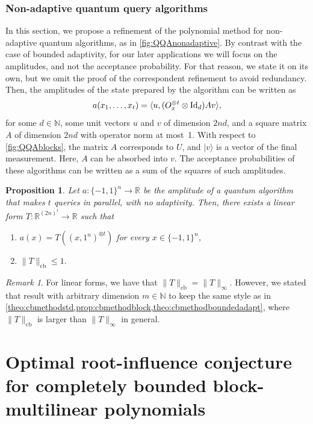 \documentclass[11pt]{article}
\DeclareMathOperator{\cb}{cb}
\newcommand{\norm}[1]{\|#1\|}
\newcommand{\R}{\mathbb{R}} %
\newcommand{\N}{\mathbb{N}} %
\newcommand{\1}{\mathbf{1}}
\newcommand{\Id}{\ensuremath{\mathop{\rm Id}\nolimits}}
\newcommand{\ket}[1]{|#1\rangle}
\theoremstyle{plain}
\newtheorem{proposition}[theorem]{Proposition}
\theoremstyle{definition}
\theoremstyle{remark}
\newtheorem{remark}[theorem]{Remark}
\begin{document}
\subsubsection{Non-adaptive quantum query algorithms} In this section, we propose a refinement of the polynomial method for non-adaptive quantum algorithms, as in \cref{fig:QQAnonadaptive}. By contrast with the case of bounded adaptivity, for our later applications we will focus on the amplitudes, and not the acceptance probability. For that reason, we state it on its own, but we omit the proof of the correspondent refinement to avoid redundancy. 
Then, the amplitudes of the state prepared by the algorithm can be written as
\begin{equation}
    a(x_1,\dots,x_t)=\langle u,(O_{x}^{\otimes t}\otimes \Id_d)Av\rangle,
\end{equation} 
for some $d\in\mathbb N$, some unit vectors $u$ and $v$ of dimension $2nd$, and a square matrix $A$ of dimension $2nd$ with operator norm at most~1. With respect to \cref{fig:QQAblocks}, the matrix $A$ corresponds to $U$, and $\ket v$ is a vector of the final measurement. Here, $A$ can be absorbed into $v$. The acceptance probabilities of these algorithms can be written as a sum of the squares of such amplitudes.

\begin{proposition}\label{prop:cbmethodnonadaptive}
    Let $a:\{-1,1\}^n\to \mathbb R$ be the amplitude of a quantum algorithm that makes $t$ queries in parallel, with no adaptivity. Then, there exists a linear form $T:\mathbb R^{(2n)^t}\to \R$ such that 
    \begin{enumerate}
        \item $a(x)=T((x,1^{n})^{\otimes t})$ 
        for every $x\in\{-1,1\}^n$,
        \item $\norm{T}_{\cb}\leq 1.$
       
    \end{enumerate}
\end{proposition}
\begin{remark}

    For linear forms, we have that $\norm{T}_{\cb}=\norm{T}_\infty.$ However, we stated that result with arbitrary dimension $m\in \N$ to keep the same style as in \cref{theo:cbmethodstd,prop:cbmethodblock,theo:cbmethodboundedadapt}, where $\norm{T}_{\cb}$ is larger than $\norm{T}_\infty$ in general. 
\end{remark}



\section{Optimal root-influence conjecture for completely bounded block-multilinear polynomials} 
\end{document}
